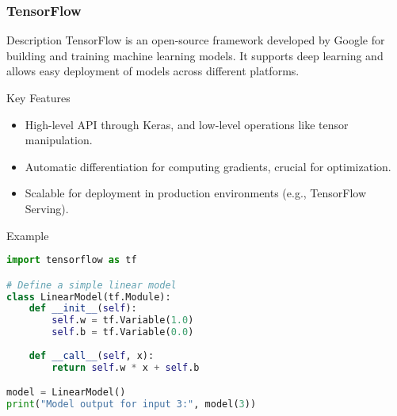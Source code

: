 \documentclass[aspectratio=169]{beamer}
\begin{document}
\begin{frame}[fragile]
    \frametitle{TensorFlow}
    \begin{block}{Description}
        TensorFlow is an open-source framework developed by Google for building and training machine learning models. It supports deep learning and allows easy deployment of models across different platforms.
    \end{block}
    \begin{block}{Key Features}
        \begin{itemize}
            \item High-level API through Keras, and low-level operations like tensor manipulation.
            \item Automatic differentiation for computing gradients, crucial for optimization.
            \item Scalable for deployment in production environments (e.g., TensorFlow Serving).
        \end{itemize}
    \end{block}
    \begin{block}{Example}
        \begin{lstlisting}[language=Python]
import tensorflow as tf

# Define a simple linear model
class LinearModel(tf.Module):
    def __init__(self):
        self.w = tf.Variable(1.0)
        self.b = tf.Variable(0.0)
    
    def __call__(self, x):
        return self.w * x + self.b

model = LinearModel()
print("Model output for input 3:", model(3))
        \end{lstlisting}
    \end{block}
\end{frame}
\end{document}
